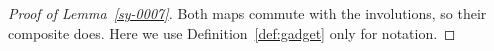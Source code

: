 \begin{proof}[Proof of Lemma~\ref{sy-0007}]
Both maps commute with the involutions, so their composite does. Here we use Definition~\ref{def:gadget} only for notation.
\end{proof}